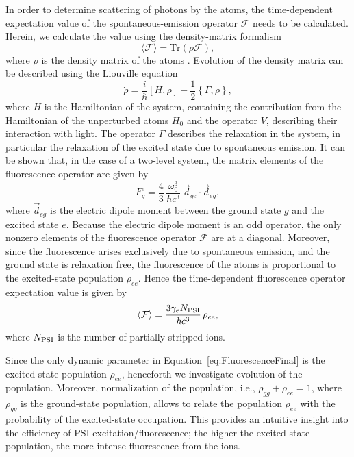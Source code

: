 In order to determine scattering of photons by the atoms, the time-dependent expectation value of the spontaneous-emission operator $\mathcal{F}$ needs to be calculated.  Herein, we calculate the value using the density-matrix formalism
\begin{equation}
	\langle\mathcal{F}\rangle=\textrm{Tr}(\rho\mathcal{F}),
	\label{eq:expF}
\end{equation}
where $\rho$ is the density matrix of the atoms \cite{AuzinshBook2010}.  Evolution of the density matrix can be described using the Liouville equation
\begin{equation}
	\dot{\rho}=\frac{i}{\hbar}[H,\rho]-\frac{1}{2}\left\{\Gamma,\rho\right\},
	\label{eq:Liouv}
\end{equation}
where $H$ is the Hamiltonian of the system, containing the contribution from the Hamiltonian of the unperturbed atoms $H_0$ and the operator $V$, describing their interaction with light. The operator $\Gamma$ describes the relaxation in the system, in particular the relaxation of the excited state due to spontaneous emission.  It can be shown \cite{AuzinshBook2010} that, in the case of a two-level system, the matrix elements of the fluorescence operator are given by
\begin{equation}
	    F^{e}_{g}=\frac{4}{3}\,\frac{\omega_{0}^3}{\hbar c^3}\;\vec{d}_{ge}\cdot\vec{d}_{eg},
	\label{eq:Fge}
\end{equation}
where $\vec{d}_{eg}$ is the electric dipole moment between the ground state $g$ and the excited state $e$.  Because the electric dipole moment is an odd operator, the only nonzero elements of the fluorescence operator $\mathcal{F}$ are at a diagonal.  Moreover, since the fluorescence arises exclusively due to spontaneous emission, and the ground state is relaxation free, the fluorescence of the atoms is proportional to the excited-state population $\rho_{ee}$.  Hence the time-dependent fluorescence operator expectation value is given by
\begin{equation}
	\langle\mathcal{F}\rangle= \frac{3\gamma_e N_{\rm PSI}}{\hbar c^3}\,\rho_{ee},
	\label{eq:FluorescenceFinal}
\end{equation}
where $N_{\rm PSI}$ is the number of partially stripped ions.

Since the only dynamic parameter in Equation~\ref{eq:FluorescenceFinal} is the excited-state population $\rho_{ee}$, henceforth we investigate evolution of the population.  Moreover, normalization of the population, i.e., $\rho_{gg}+\rho_{ee}=1$, where $\rho_{gg}$ is the ground-state population, allows to relate the population $\rho_{ee}$ with the probability of the excited-state occupation.  This provides an intuitive insight into the efficiency of PSI excitation/fluorescence; the higher the excited-state population, the more intense fluorescence from the ions.

